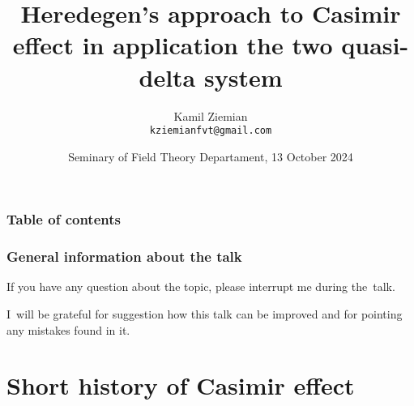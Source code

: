 \documentclass[10pt,t]{beamer}
\title{Heredegen's approach to Casimir effect in application the
  two quasi-delta system}
\author{Kamil Ziemian \\
  \texttt{kziemianfvt@gmail.com}}
\date[13 X 2024]{Seminary of Field Theory Departament,
  13 October 2024}
\begin{document}





\RaggedRight





\maketitle





\begin{frame}
  \frametitle{Table of contents}


  \tableofcontents %

\end{frame}












\begin{frame}
  \frametitle{General information about the talk}


  If you have any question about the topic, please interrupt me during
  the~talk.

  I~will be grateful for suggestion how this talk can be improved and for
  pointing any mistakes found in it.

\end{frame}










\section{Short history of Casimir effect}
\end{document}
